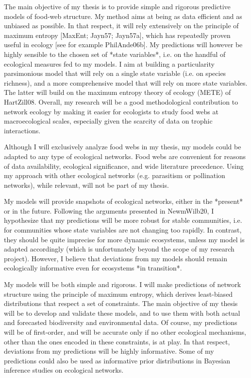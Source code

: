 The main objective of my thesis is to provide simple and rigorous predictive
models of food-web structure. My method aims at being as data efficient and as
unbiased as possible. In that respect, it will rely extensively on the principle
of maximum entropy [MaxEnt; Jayn57; Jayn57a], which has repeatedly proven
useful in ecology [see for example PhilAnde06b]. My predictions will however be
highly sensible to the chosen set of *state variables*, i.e. on the handful of
ecological measures fed to my models. I aim at building a particularity
parsimonious model that will rely on a single state variable (i.e. on species
richness), and a more comprehensive model that will rely on more state
variables. The latter will build on the maximum entropy theory of ecology (METE)
of HartZill08. Overall, my research will be a good methodological contribution
to network ecology by making it easier for ecologists to study food webs at
macroecological scales, especially given the scarcity of data on trophic
interactions.

Although I will exclusively analyze food webs in my thesis, my models could be
adapted to any type of ecological networks. Food webs are convenient for reasons
of data availability, ecological significance, and wide literature precedence.
Using my approach with other ecological networks (e.g. parasitism or pollination
networks), while relevant, will not be part of my thesis.

My models will provide snapshots of ecological networks, either in the *present*
or in the future. Following the arguments presented in NewmWilb20, I
hypothesize that my predictions will be more robust for stable communities, i.e.
for communities whose state variables are not changing too rapidly. In contrast,
they should be quite imprecise for more dynamic ecosystems, unless my model is
adapted accordingly (which is unfortunately beyond the scope of my research
project). However, I believe that deviations from my models should remain
ecologically informative even for ecosystems *in transition*.  

My models will be both simple and rigorous. I will make predictions of network
structure using the principle of maximum entropy, which derives least-biased
distributions that respect a set of constraints. The main objective of my thesis
will be to develop and validate these models, and to use them with both actual
and forecasted biodiversity and environmental data. Of course, my predictions
will be of first-order, and will be accurate only if no other ecological
mechanisms, other than the ones encoded in these constraints, is at play. In
that respect, deviations from my predictions will be highly informative. Some of
my predictions could also be used as informative prior distributions in Bayesian
inference studies on ecological networks.

